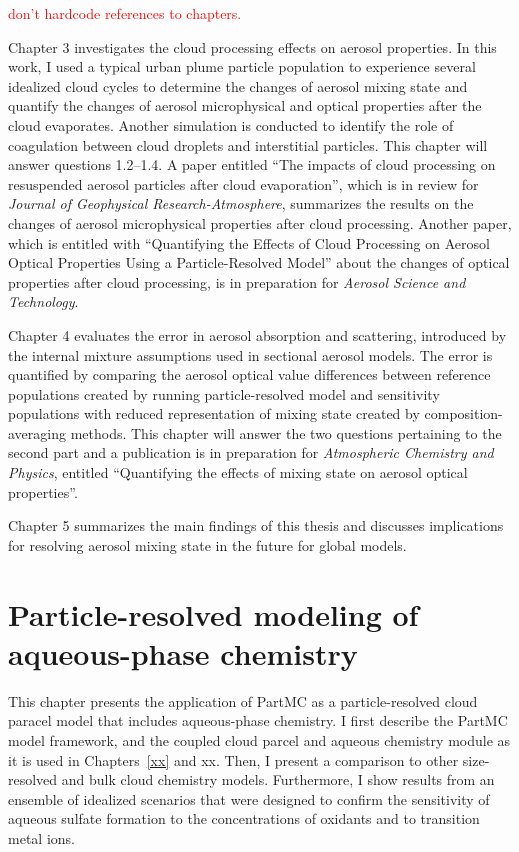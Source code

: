 \documentclass[edeposit,fullpage]{uiucthesis2009}
\begin{document}
\textcolor{red}{don't hardcode references to chapters.}

Chapter 3 investigates the cloud processing effects on aerosol
properties. In this work, I used a typical urban plume particle
population to experience several idealized cloud cycles to determine
the changes of aerosol mixing state and quantify the changes of
aerosol microphysical and optical properties after the cloud
evaporates. Another simulation is conducted to identify the role of
coagulation between cloud droplets and interstitial particles. This
chapter will answer questions 1.2--1.4. A paper entitled ``The impacts
of cloud processing on resuspended aerosol particles after cloud
evaporation'', which is in review for \textit{Journal of Geophysical
  Research-Atmosphere}, summarizes the results on the changes of
aerosol microphysical properties after cloud processing. Another
paper, which is entitled with ``Quantifying the Effects of Cloud
Processing on Aerosol Optical Properties Using a Particle-Resolved
Model'' about the changes of optical properties after cloud
processing, is in preparation for \textit{Aerosol Science and
  Technology}.

Chapter 4 evaluates the error in aerosol absorption and scattering,
introduced by the internal mixture assumptions used in sectional
aerosol models. The error is quantified by comparing the aerosol
optical value differences between reference populations created by
running particle-resolved model and sensitivity populations with
reduced representation of mixing state created by
composition-averaging methods. This chapter will answer the two
questions pertaining to the second part and a publication is in
preparation for \textit{Atmospheric Chemistry and Physics}, entitled
``Quantifying the effects of mixing state on aerosol optical
properties''.

Chapter 5 summarizes the main findings of this thesis and discusses
implications for resolving aerosol mixing state in the future for
global models.
\chapter{Particle-resolved modeling of aqueous-phase chemistry}

This chapter presents the application of PartMC as a particle-resolved
cloud paracel model that includes aqueous-phase chemistry. I first
describe the PartMC model framework, and the coupled cloud parcel and
aqueous chemistry module as it is used in Chapters~\ref{xx} and
{xx}. Then, I present a comparison to other size-resolved and bulk
cloud chemistry models. Furthermore, I show results from an ensemble
of idealized scenarios that were designed to confirm the sensitivity
of aqueous sulfate formation to the concentrations of oxidants and to
transition metal ions.
\end{document}
